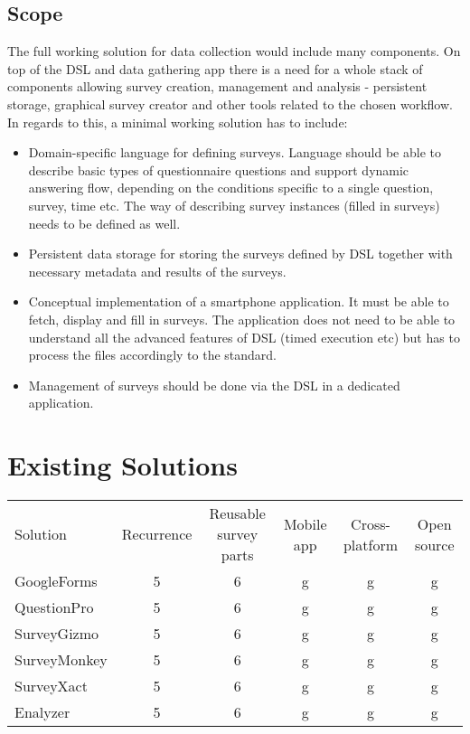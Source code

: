 \subsection{Scope}
The full working solution for data collection would include many components. On top of the DSL and data gathering app there is a need for a whole stack of components allowing survey creation, management and analysis - persistent storage, graphical survey creator and other tools related to the chosen workflow. In regards to this, a minimal working solution has to include:
\begin{itemize}
\item Domain-specific language for defining surveys. Language should be able to describe basic types of questionnaire questions and support dynamic answering flow, depending on the conditions specific to a single question, survey, time etc. The way of describing survey instances (filled in surveys) needs to be defined as well.
\item Persistent data storage for storing the surveys defined by DSL together with necessary metadata and results of the surveys.
\item Conceptual implementation of a smartphone application. It must be able to fetch, display and fill in surveys. The application does not need to be able to understand all the advanced features of DSL (timed execution etc) but has to process the files accordingly to the standard.
\item Management of surveys should be done via the DSL in a dedicated application.
\end{itemize}

\section{Existing Solutions}
\label{sec:existingsolutions}

\begin{tabular}{l | c | c | c | c | c}
  Solution & Recurrence & Reusable survey parts & Mobile app & Cross-platform & Open source\\
  GoogleForms & 5 & 6 & g & g & g\\
  QuestionPro & 5 & 6 & g & g & g\\
  SurveyGizmo & 5 & 6 & g & g & g\\
  SurveyMonkey & 5 & 6 & g & g & g\\
  SurveyXact & 5 & 6 & g & g & g\\
  Enalyzer & 5 & 6 & g & g & g\\
\end{tabular}